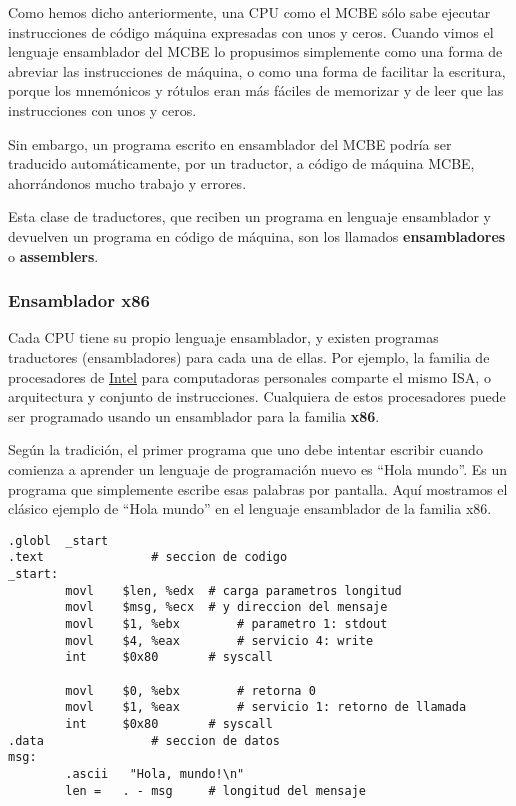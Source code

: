 \documentclass[spanish,a4paper,]{article}
\begin{document}
Como hemos dicho anteriormente, una CPU como el MCBE sólo sabe ejecutar
instrucciones de código máquina expresadas con unos y ceros. Cuando
vimos el lenguaje ensamblador del MCBE lo propusimos simplemente como
una forma de abreviar las instrucciones de máquina, o como una forma de
facilitar la escritura, porque los mnemónicos y rótulos eran más fáciles
de memorizar y de leer que las instrucciones con unos y ceros.

Sin embargo, un programa escrito en ensamblador del MCBE podría ser
traducido automáticamente, por un traductor, a código de máquina MCBE,
ahorrándonos mucho trabajo y errores.

Esta clase de traductores, que reciben un programa en lenguaje
ensamblador y devuelven un programa en código de máquina, son los
llamados \textbf{ensambladores} o \textbf{assemblers}.

\hypertarget{ensamblador-x86}{%
\subsubsection{Ensamblador x86}\label{ensamblador-x86}}

Cada CPU tiene su propio lenguaje ensamblador, y existen programas
traductores (ensambladores) para cada una de ellas. Por ejemplo, la
familia de procesadores de
\href{https://es.m.wikipedia.org/wiki/Intel_Corporation}{Intel} para
computadoras personales comparte el mismo ISA, o arquitectura y conjunto
de instrucciones. Cualquiera de estos procesadores puede ser programado
usando un ensamblador para la familia \textbf{x86}.

Según la tradición, el primer programa que uno debe intentar escribir
cuando comienza a aprender un lenguaje de programación nuevo es ``Hola
mundo''. Es un programa que simplemente escribe esas palabras por
pantalla. Aquí mostramos el clásico ejemplo de ``Hola mundo'' en el
lenguaje ensamblador de la familia x86.

\begin{verbatim}
.globl  _start
.text               # seccion de codigo
_start:
        movl    $len, %edx  # carga parametros longitud
        movl    $msg, %ecx  # y direccion del mensaje
        movl    $1, %ebx        # parametro 1: stdout
        movl    $4, %eax        # servicio 4: write
        int     $0x80       # syscall

        movl    $0, %ebx        # retorna 0
        movl    $1, %eax        # servicio 1: retorno de llamada
        int     $0x80       # syscall
.data               # seccion de datos
msg:
        .ascii   "Hola, mundo!\n"
        len =   . - msg     # longitud del mensaje
\end{verbatim}
\end{document}
